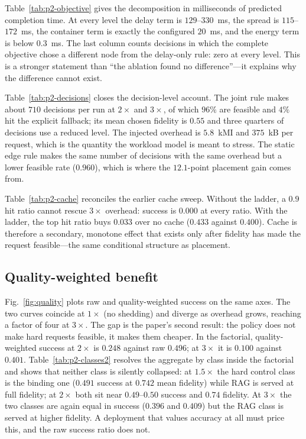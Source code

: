 \documentclass[journal,10pt]{IEEEtran}
\begin{document}


Table~\ref{tab:p2-objective} gives the decomposition in milliseconds of
predicted completion time. At every level the delay term is $129$--$330$~ms, the
spread is $115$--$172$~ms, the container term is exactly the configured
$20$~ms, and the energy term is below $0.3$~ms. The last column counts decisions
in which the complete objective chose a different node from the delay-only rule:
zero at every level. This is a stronger statement than ``the ablation found no
difference''---it explains why the difference cannot exist.



Table~\ref{tab:p2-decisions} closes the decision-level account. The joint rule
makes about $710$ decisions per run at $2\times$ and $3\times$, of which
$96\%$ are feasible and $4\%$ hit the explicit fallback; its mean chosen fidelity
is $0.55$ and three quarters of decisions use a reduced level. The injected
overhead is $5.8$~kMI and $375$~kB per request, which is the quantity the
workload model is meant to stress. The static edge rule makes the same number of
decisions with the same overhead but a lower feasible rate ($0.960$), which is
where the $12.1$-point placement gain comes from.



Table~\ref{tab:p2-cache} reconciles the earlier cache sweep. Without the ladder,
a $0.9$ hit ratio cannot rescue $3\times$ overhead: success is $0.000$ at every
ratio. With the ladder, the top hit ratio buys $0.033$ over no cache
($0.433$ against $0.400$). Cache is therefore a secondary, monotone effect that
exists only after fidelity has made the request feasible---the same conditional
structure as placement.

\subsection{Quality-weighted benefit}
\label{sec:quality}
Fig.~\ref{fig:quality} plots raw and quality-weighted success on the same axes.
The two curves coincide at $1\times$ (no shedding) and diverge as overhead
grows, reaching a factor of four at $3\times$. The gap is the paper's second
result: the policy does not make hard requests feasible, it makes them cheaper.
In the factorial, quality-weighted success at $2\times$ is $0.248$ against raw
$0.496$; at $3\times$ it is $0.100$ against $0.401$. Table~\ref{tab:p2-classes2}
resolves the aggregate by class inside the factorial and shows that neither
class is silently collapsed: at $1.5\times$ the hard control class is the
binding one ($0.491$ success at $0.742$ mean fidelity) while RAG is served at
full fidelity; at $2\times$ both sit near $0.49$--$0.50$ success and $0.74$
fidelity. At $3\times$ the two classes are again equal in success ($0.396$ and
$0.409$) but the RAG class is served at higher fidelity. A deployment that
values accuracy at all must price this, and the raw success ratio does not.
\end{document}
